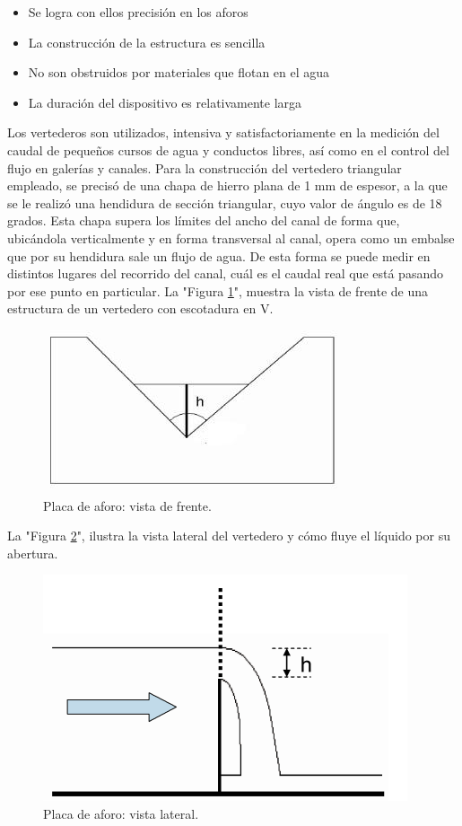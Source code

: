 \begin{itemize}
\item Se logra con ellos precisión en los aforos 	
\item La construcción de la estructura es sencilla
\item No son obstruidos por materiales que flotan en el agua 
\item La duración del dispositivo es relativamente larga
\end{itemize}
Los vertederos son utilizados, intensiva y satisfactoriamente en la medición del caudal de pequeños cursos de agua y conductos libres, así como en el control del flujo en galerías y canales.
Para la construcción del vertedero triangular empleado, se precisó de una chapa de hierro plana de 1 mm de espesor, a la que se le  realizó una hendidura de sección triangular, cuyo  valor de ángulo es de 18 grados.
Esta chapa supera los límites del ancho del canal de forma que, ubicándola  verticalmente y en forma transversal al canal, opera como un embalse que por su hendidura sale un flujo de agua.
De esta forma se puede medir en distintos lugares del recorrido del canal, cuál es el caudal real que está pasando por ese punto en particular.  
La "Figura \ref{fig:Placa de aforo}",  muestra la vista de frente de una estructura de un vertedero con escotadura en V. 	
\begin{figure}
\centering
\includegraphics[scale=.85]{./Figures/PlacaDeAforo.jpeg}
\caption{Placa de aforo: vista de frente.}
\label{fig:Placa de aforo}
\end{figure}
La "Figura \ref{fig:Placa de aforo-VistaLateral}", ilustra la vista lateral del vertedero y cómo fluye el líquido por su abertura.
\begin{figure}
\centering
\includegraphics[scale=.85]{./Figures/PlacaDeAforo-VistaLateral.png}
\caption{Placa de aforo: vista lateral.}
\label{fig:Placa de aforo-VistaLateral}
\end{figure}
